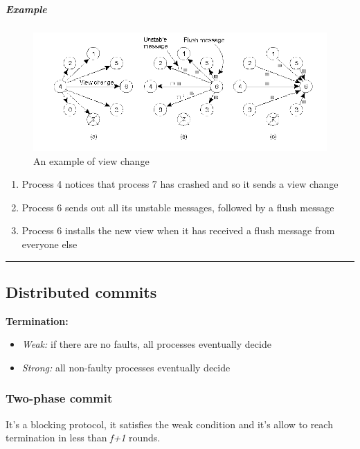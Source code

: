 \subparagraph{Example}
\begin{figure}[htbp]
\centering
\includegraphics{src/images/fault-tolerance/VS.png}
\caption{An example of view change}
\end{figure}

\begin{enumerate}
    \item Process 4 notices that process 7 has crashed and so it sends a view change
    \item Process 6 sends out all its unstable messages, followed by a flush message
    \item Process 6 installs the new view when it has received a flush message from everyone else
\end{enumerate}

\begin{center}\rule{3in}{0.4pt}\end{center}

\subsection{Distributed commits}\label{distributed-commits}

\textbf{Termination:}

\begin{itemize}
\itemsep1pt\parskip0pt
\item
  \emph{Weak:} if there are no faults, all processes eventually decide
\item
  \emph{Strong:} all non-faulty processes eventually decide
\end{itemize}

\subsubsection{Two-phase commit}\label{two-phase-commit}

It's a blocking protocol, it satisfies the weak condition and it's allow
to reach termination in less than \emph{f+1} rounds.

